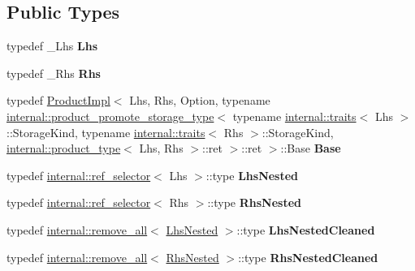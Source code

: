 \subsection*{Public Types}
\begin{DoxyCompactItemize}
\item 
\mbox{\label{class_eigen_1_1_product_a75ac4de5a04289ada659d2ef0702d401}} 
typedef \+\_\+\+Lhs {\bfseries Lhs}
\item 
\mbox{\label{class_eigen_1_1_product_ad7c779f80b5186913994027645075321}} 
typedef \+\_\+\+Rhs {\bfseries Rhs}
\item 
\mbox{\label{class_eigen_1_1_product_ae759c5f2bd908864c60445c885fc3073}} 
typedef \mbox{\hyperlink{class_eigen_1_1_product_impl}{Product\+Impl}}$<$ Lhs, Rhs, Option, typename \mbox{\hyperlink{struct_eigen_1_1internal_1_1product__promote__storage__type}{internal\+::product\+\_\+promote\+\_\+storage\+\_\+type}}$<$ typename \mbox{\hyperlink{struct_eigen_1_1internal_1_1traits}{internal\+::traits}}$<$ Lhs $>$\+::Storage\+Kind, typename \mbox{\hyperlink{struct_eigen_1_1internal_1_1traits}{internal\+::traits}}$<$ Rhs $>$\+::Storage\+Kind, \mbox{\hyperlink{struct_eigen_1_1internal_1_1product__type}{internal\+::product\+\_\+type}}$<$ Lhs, Rhs $>$\+::ret $>$\+::ret $>$\+::Base {\bfseries Base}
\item 
\mbox{\label{class_eigen_1_1_product_ac0957e4b104ce7574603b0695d7ef069}} 
typedef \mbox{\hyperlink{struct_eigen_1_1internal_1_1ref__selector}{internal\+::ref\+\_\+selector}}$<$ Lhs $>$\+::type {\bfseries Lhs\+Nested}
\item 
\mbox{\label{class_eigen_1_1_product_ad31523d37563830548c5d17ed62a979d}} 
typedef \mbox{\hyperlink{struct_eigen_1_1internal_1_1ref__selector}{internal\+::ref\+\_\+selector}}$<$ Rhs $>$\+::type {\bfseries Rhs\+Nested}
\item 
\mbox{\label{class_eigen_1_1_product_a1f6d406ec25629642f7e53cdbca81320}} 
typedef \mbox{\hyperlink{struct_eigen_1_1internal_1_1remove__all}{internal\+::remove\+\_\+all}}$<$ \mbox{\hyperlink{struct_eigen_1_1internal_1_1true__type}{Lhs\+Nested}} $>$\+::type {\bfseries Lhs\+Nested\+Cleaned}
\item 
\mbox{\label{class_eigen_1_1_product_a1d0a97236e67c182df8472de06cba958}} 
typedef \mbox{\hyperlink{struct_eigen_1_1internal_1_1remove__all}{internal\+::remove\+\_\+all}}$<$ \mbox{\hyperlink{struct_eigen_1_1internal_1_1true__type}{Rhs\+Nested}} $>$\+::type {\bfseries Rhs\+Nested\+Cleaned}
\end{DoxyCompactItemize}
